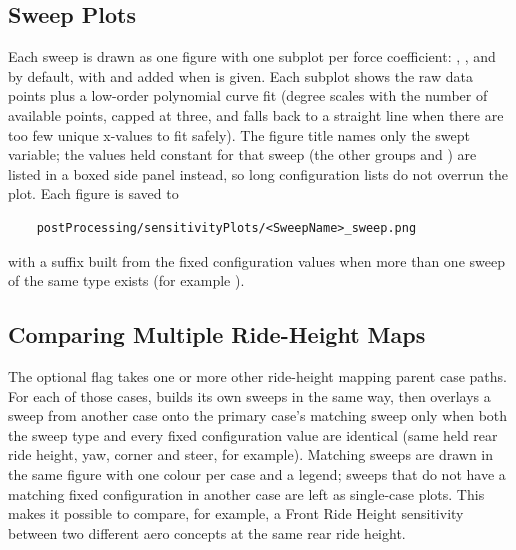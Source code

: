 \subsection{Sweep Plots}
Each sweep is drawn as one figure with one subplot per force coefficient: , ,  and  by default, with  and  added when  is given. Each subplot shows the raw data points plus a low-order polynomial curve fit (degree scales with the number of available points, capped at three, and falls back to a straight line when there are too few unique x-values to fit safely). The figure title names only the swept variable; the values held constant for that sweep (the other groups and ) are listed in a boxed side panel instead, so long configuration lists do not overrun the plot. Each figure is saved to
\begin{lstlisting}
    postProcessing/sensitivityPlots/<SweepName>_sweep.png
\end{lstlisting}
with a suffix built from the fixed configuration values when more than one sweep of the same type exists (for example ).

\subsection{Comparing Multiple Ride-Height Maps}
The optional  flag takes one or more other ride-height mapping parent case paths. For each of those cases,  builds its own sweeps in the same way, then overlays a sweep from another case onto the primary case's matching sweep only when both the sweep type and every fixed configuration value are identical (same held rear ride height, yaw, corner and steer, for example). Matching sweeps are drawn in the same figure with one colour per case and a legend; sweeps that do not have a matching fixed configuration in another case are left as single-case plots. This makes it possible to compare, for example, a Front Ride Height sensitivity between two different aero concepts at the same rear ride height.

